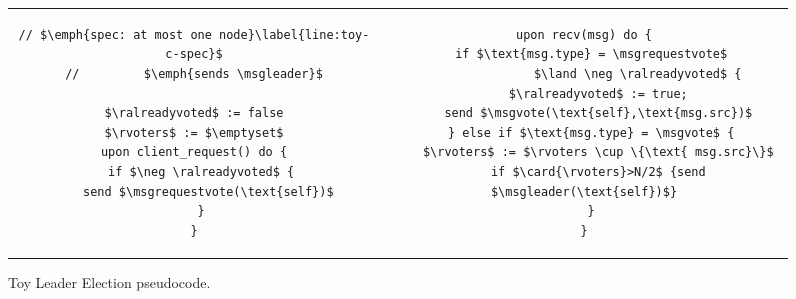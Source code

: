 
%

\begin{figure}
\begin{minipage}{\columnwidth}
\lstset{firstnumber=last}
\begin{tabular}{cc}
\begin{lstlisting}
// $\emph{spec: at most one node}\label{line:toy-c-spec}$
//         $\emph{sends \msgleader}$

$\ralreadyvoted$ := false
$\rvoters$ := $\emptyset$
upon client_request() do {
  if $\neg \ralreadyvoted$ {
    send $\msgrequestvote(\text{self})$
  }
}
\end{lstlisting} \hspace{0.2cm}
&
\begin{lstlisting}
upon recv(msg) do {
  if $\text{msg.type} = \msgrequestvote$
               $\land \neg \ralreadyvoted$ {
    $\ralreadyvoted$ := true;
    send $\msgvote(\text{self},\text{msg.src})$
  } else if $\text{msg.type} = \msgvote$ {
    $\rvoters$ := $\rvoters \cup \{\text{ msg.src}\}$
    if $\card{\rvoters}>N/2$ {send $\msgleader(\text{self})$}
  }
}
\end{lstlisting}
\end{tabular}
\end{minipage}
\caption{\label{fig:toy-c}Toy Leader Election pseudocode.}
\end{figure}
